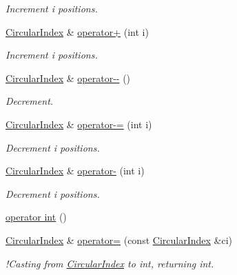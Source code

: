 \begin{DoxyCompactItemize}
\begin{DoxyCompactList}\small\item\em Increment \textquotesingle{}i\textquotesingle{} positions. \end{DoxyCompactList}\item 
\hyperlink{classupc_1_1CircularIndex}{Circular\+Index} \& \hyperlink{classupc_1_1CircularIndex_a1e03db5aad51600b2804b7866af81b01}{operator+} (int i)
\begin{DoxyCompactList}\small\item\em Increment \textquotesingle{}i\textquotesingle{} positions. \end{DoxyCompactList}\item 
\hyperlink{classupc_1_1CircularIndex}{Circular\+Index} \& \hyperlink{classupc_1_1CircularIndex_a4527e57789e25c6157111ab491cc38a9}{operator-\/-\/} ()
\begin{DoxyCompactList}\small\item\em Decrement. \end{DoxyCompactList}\item 
\hyperlink{classupc_1_1CircularIndex}{Circular\+Index} \& \hyperlink{classupc_1_1CircularIndex_a4b2892d8a0b891b90bcb34ee55c3d613}{operator-\/=} (int i)
\begin{DoxyCompactList}\small\item\em Decrement \textquotesingle{}i\textquotesingle{} positions. \end{DoxyCompactList}\item 
\hyperlink{classupc_1_1CircularIndex}{Circular\+Index} \& \hyperlink{classupc_1_1CircularIndex_a7745755030622a01389f2133632d7f76}{operator-\/} (int i)
\begin{DoxyCompactList}\small\item\em Decrement \textquotesingle{}i\textquotesingle{} positions. \end{DoxyCompactList}\item 
\hyperlink{classupc_1_1CircularIndex_ab0961d598cc0a51a2990e8823f71a332}{operator int} ()
\item 
\hyperlink{classupc_1_1CircularIndex}{Circular\+Index} \& \hyperlink{classupc_1_1CircularIndex_ab23f2d6ba2b5781153bcf6383cce8afc}{operator=} (const \hyperlink{classupc_1_1CircularIndex}{Circular\+Index} \&ci)
\begin{DoxyCompactList}\small\item\em !\+Casting from \hyperlink{classupc_1_1CircularIndex}{Circular\+Index} to int, returning int. \end{DoxyCompactList}\end{DoxyCompactItemize}
